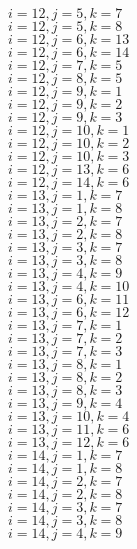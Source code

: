 \documentclass[14pt]{article}
\begin{document}
    $i=12,j=5,k=7 $ \\ 
    $i=12,j=5,k=8 $ \\ 
    $i=12,j=6,k=13 $ \\ 
    $i=12,j=6,k=14 $ \\ 
    $i=12,j=7,k=5 $ \\ 
    $i=12,j=8,k=5 $ \\ 
    $i=12,j=9,k=1 $ \\ 
    $i=12,j=9,k=2 $ \\ 
    $i=12,j=9,k=3 $ \\ 
    $i=12,j=10,k=1 $ \\ 
    $i=12,j=10,k=2 $ \\ 
    $i=12,j=10,k=3 $ \\ 
    $i=12,j=13,k=6 $ \\ 
    $i=12,j=14,k=6 $ \\ 
    $i=13,j=1,k=7 $ \\ 
    $i=13,j=1,k=8 $ \\ 
    $i=13,j=2,k=7 $ \\ 
    $i=13,j=2,k=8 $ \\ 
    $i=13,j=3,k=7 $ \\ 
    $i=13,j=3,k=8 $ \\ 
    $i=13,j=4,k=9 $ \\ 
    $i=13,j=4,k=10 $ \\ 
    $i=13,j=6,k=11 $ \\ 
    $i=13,j=6,k=12 $ \\ 
    $i=13,j=7,k=1 $ \\ 
    $i=13,j=7,k=2 $ \\ 
    $i=13,j=7,k=3 $ \\ 
    $i=13,j=8,k=1 $ \\ 
    $i=13,j=8,k=2 $ \\ 
    $i=13,j=8,k=3 $ \\ 
    $i=13,j=9,k=4 $ \\ 
    $i=13,j=10,k=4 $ \\ 
    $i=13,j=11,k=6 $ \\ 
    $i=13,j=12,k=6 $ \\ 
    $i=14,j=1,k=7 $ \\ 
    $i=14,j=1,k=8 $ \\ 
    $i=14,j=2,k=7 $ \\ 
    $i=14,j=2,k=8 $ \\ 
    $i=14,j=3,k=7 $ \\ 
    $i=14,j=3,k=8 $ \\ 
    $i=14,j=4,k=9 $ \\ 
\end{document}
